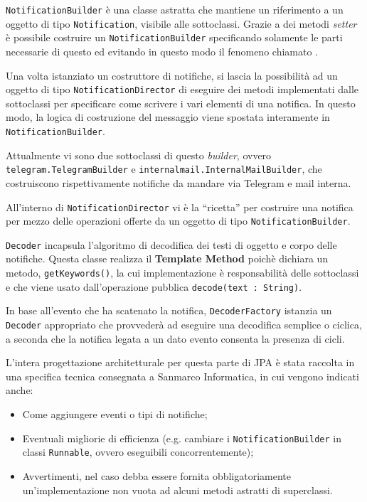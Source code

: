 \texttt{NotificationBuilder} è una classe astratta che mantiene un riferimento
a un oggetto di tipo \texttt{Notification}, visibile alle sottoclassi. Grazie
a dei metodi \emph{setter} è possibile costruire un
\texttt{NotificationBuilder} specificando solamente le parti necessarie di
questo ed evitando in questo modo il fenomeno chiamato .

Una volta istanziato un costruttore di notifiche, si lascia la possibilità ad
un oggetto di tipo \texttt{NotificationDirector} di eseguire dei metodi
implementati dalle sottoclassi per specificare come scrivere i vari elementi
di una notifica. In questo modo, la logica di costruzione del messaggio viene
spostata interamente in \texttt{NotificationBuilder}.

Attualmente vi sono due sottoclassi di questo \emph{builder}, ovvero
\texttt{telegram.TelegramBuilder} e \texttt{internalmail.InternalMailBuilder},
che costruiscono rispettivamente notifiche da mandare via Telegram e mail
interna.

All'interno di \texttt{NotificationDirector} vi è la ``ricetta'' per costruire
una notifica per mezzo delle operazioni offerte da un oggetto di tipo
\texttt{NotificationBuilder}.

\texttt{Decoder} incapsula l'algoritmo di decodifica dei testi di oggetto e
corpo delle notifiche. Questa classe realizza il 
\textbf{Template Method} poichè dichiara un metodo, \texttt{getKeywords()}, la
cui implementazione è responsabilità delle sottoclassi e che viene usato
dall'operazione pubblica \texttt{decode(text : String)}.

In base all'evento che ha scatenato la notifica, \texttt{DecoderFactory}
istanzia un \texttt{Decoder} appropriato che provvederà ad eseguire una
decodifica semplice o ciclica, a seconda che la notifica legata a un dato
evento consenta la presenza di cicli.

L'intera progettazione architetturale per questa parte di JPA è stata raccolta
in una specifica tecnica consegnata a Sanmarco Informatica, in cui vengono
indicati anche:

\begin{itemize}
\item Come aggiungere eventi o tipi di notifiche;
\item Eventuali migliorie di efficienza (e.g. cambiare i
  \texttt{NotificationBuilder} in classi \texttt{Runnable}, ovvero eseguibili
  concorrentemente);
\item Avvertimenti, nel caso debba essere fornita obbligatoriamente
  un'implementazione non vuota ad alcuni metodi astratti di superclassi.
\end{itemize}

